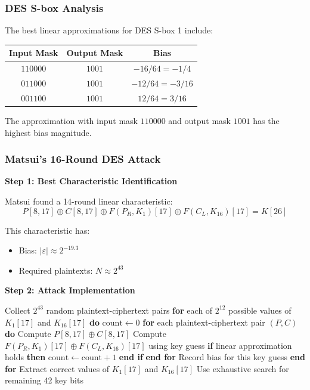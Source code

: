 \documentclass[12pt,a4paper]{article}
\newcommand{\bias}{\varepsilon}
\newcommand{\xor}{\oplus}
\begin{document}
\subsubsection{DES S-box Analysis}

\begin{examplebox}[title=DES S-box 1 Linear Approximations]
The best linear approximations for DES S-box 1 include:

\begin{center}
\begin{tabular}{ccc}
\toprule
Input Mask & Output Mask & Bias \\
\midrule
$110000$ & $1001$ & $-16/64 = -1/4$ \\
$011000$ & $1001$ & $-12/64 = -3/16$ \\
$001100$ & $1001$ & $12/64 = 3/16$ \\
\bottomrule
\end{tabular}
\end{center}

The approximation with input mask $110000$ and output mask $1001$ has the highest bias magnitude.
\end{examplebox}

\subsubsection{Matsui's 16-Round DES Attack}

\textbf{Step 1: Best Characteristic Identification}

Matsui found a 14-round linear characteristic:
$$P[8,17] \xor C[8,17] \xor F(P_R,K_{1})[17] \xor F(C_L,K_{16})[17] = K[26]$$

This characteristic has:
\begin{itemize}
    \item Bias: $|\bias| \approx 2^{-19.3}$
    \item Required plaintexts: $N \approx 2^{43}$
\end{itemize}

\textbf{Step 2: Attack Implementation}

\begin{algorithmbox}[title=Matsui's DES Attack]
\begin{algorithmic}
\State Collect $2^{43}$ random plaintext-ciphertext pairs
\State \textbf{for} each of $2^{12}$ possible values of $K_{1}[17]$ and $K_{16}[17]$ \textbf{do}
\State \quad $\text{count} \leftarrow 0$
\State \quad \textbf{for} each plaintext-ciphertext pair $(P,C)$ \textbf{do}
\State \quad \quad Compute $P[8,17] \xor C[8,17]$
\State \quad \quad Compute $F(P_R,K_{1})[17] \xor F(C_L,K_{16})[17]$ using key guess
\State \quad \quad \textbf{if} linear approximation holds \textbf{then}
\State \quad \quad \quad $\text{count} \leftarrow \text{count} + 1$
\State \quad \quad \textbf{end if}
\State \quad \textbf{end for}
\State \quad Record bias for this key guess
\State \textbf{end for}
\State Extract correct values of $K_{1}[17]$ and $K_{16}[17]$
\State Use exhaustive search for remaining 42 key bits
\end{algorithmic}
\end{algorithmbox}
\end{document}
